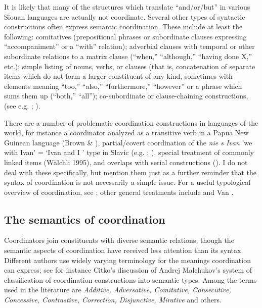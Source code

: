 \documentclass[output=paper]{LSP/langsci}
\begin{document}
It is likely that many of the structures which translate ``and/or/but'' in various Siouan languages are actually not coordinate. Several other types of syntactic constructions often express semantic coordination. These include at least the following:  comitatives (prepositional phrases or subordinate clauses expressing ``accompaniment'' or a ``with'' relation);  adverbial clauses with temporal or other subordinate relations to a matrix clause (``when,'' ``although,'' ``having done X,'' etc.);  simple listing of nouns, verbs, or clauses (that is, concatenation of separate items which do not form a larger constituent of any kind, sometimes with elements meaning ``too,'' ``also,'' ``furthermore,'' ``however'' or a phrase which sums them up (``both,'' ``all'');  co-subordinate or clause-chaining constructions, (see e.g. \citealt{Graczyk2007}; \citealt{Boyle2007}).

There are a number of problematic coordination constructions in languages of the world, for instance a coordinator analyzed as a transitive verb in a Papua New Guinean language (Brown \& \citealt{Dryer2008}),  partial/covert coordination of the \textit{nie s Ivan} 'we with Ivan' = `Ivan and I ' type in Slavic (e.g. \citealt{McNally1993}; \citealt{Larson2014}), special treatment of commonly linked items (W\"alchli 1995), and overlaps with serial constructions (\citealt{Carstens2002}). I do not deal with these specifically, but mention them just as a further reminder that the syntax of coordination is not necessarily a simple issue. For a useful typological overview of coordination, see \citet{Haspelmath2007}; other general treatments include \citet{Johannessen1998} and Van \citet{Oirsouw1987}. 

\subsection{The semantics of coordination}

Coordinators join constituents with diverse semantic relations, though the semantic aspects of coordination have received less attention than its syntax. Different authors use widely varying terminology for the meanings coordination can express; see for instance Citko's  discussion of Andrej Malchukov's system of classification of coordination constructions into semantic types. Among the terms used in the literature are \textit{Additive, Adversative, Comitative, Consecutive, Concessive, Contrastive, Correction, Disjunctive, Mirative} and others.
\end{document}
